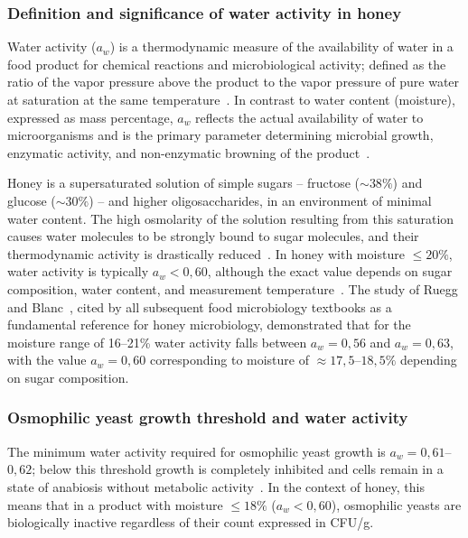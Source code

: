 \subsubsection{Definition and significance of water activity in honey}

Water activity ($a_w$) is a thermodynamic measure of the
availability of water in a food product for chemical reactions
and microbiological activity; defined as the ratio of the vapor
pressure above the product to the vapor pressure of pure water
at saturation at the same
temperature~\cite{waaw2006}.
In contrast to water content (moisture), expressed as mass
percentage, $a_w$ reflects the actual availability of water to
microorganisms and is the primary parameter determining microbial
growth, enzymatic activity, and non-enzymatic browning of the
product~\cite{waaw2006}.

Honey is a supersaturated solution of simple sugars -- fructose
($\sim 38\%$) and glucose ($\sim 30\%$) -- and higher
oligosaccharides, in an environment of minimal water content.
The high osmolarity of the solution resulting from this saturation
causes water molecules to be strongly bound to sugar molecules,
and their thermodynamic activity is drastically
reduced~\cite{zamora2006,waaw2006}. In honey with moisture
$\leq 20\%$, water activity is typically $a_w < 0{,}60$,
although the exact value depends on sugar composition, water
content, and measurement
temperature~\cite{ruegg1981,gleiter2006}.
The study of Ruegg and Blanc~\cite{ruegg1981}, cited by all
subsequent food microbiology textbooks as a fundamental reference
for honey microbiology, demonstrated that for the moisture range
of 16--21\% water activity falls between $a_w = 0{,}56$ and
$a_w = 0{,}63$, with the value $a_w = 0{,}60$ corresponding to
moisture of $\approx 17{,}5$--$18{,}5\%$ depending on sugar
composition.

\subsubsection{Osmophilic yeast growth threshold and water activity}

The minimum water activity required for osmophilic yeast growth
is $a_w = 0{,}61$--$0{,}62$; below this threshold growth is
completely inhibited and cells remain in a state of anabiosis
without metabolic activity~\cite{ruegg1981,alwaili2012}.
In the context of honey, this means that in a product with moisture
$\leq 18\%$ ($a_w < 0{,}60$), osmophilic yeasts are biologically
inactive regardless of their count expressed in CFU/g.

